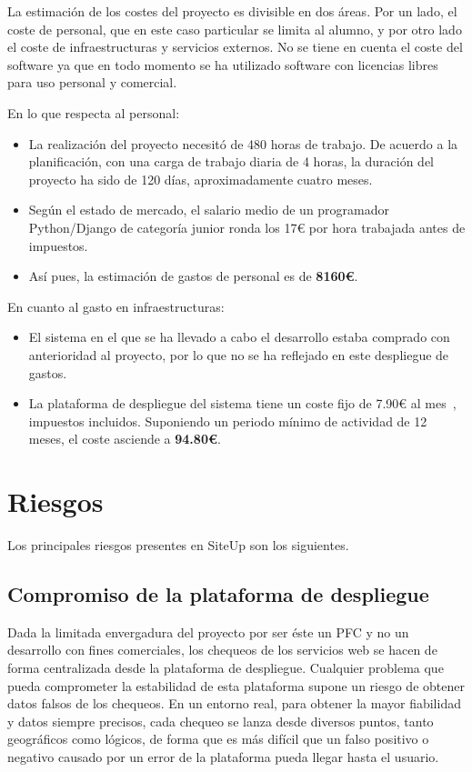 La estimación de los costes del proyecto es divisible en dos áreas. Por un lado,
el coste de personal, que en este caso particular se limita al alumno, y por
otro lado el coste de infraestructuras y servicios externos. No se tiene en
cuenta el coste del software ya que en todo momento se ha utilizado software con
licencias libres para uso personal y comercial.

En lo que respecta al personal:

\begin{itemize}
\item La realización del proyecto necesitó de 480 horas de trabajo. De acuerdo a
  la planificación, con una carga de trabajo diaria de 4 horas, la duración del
  proyecto ha sido de 120 días, aproximadamente cuatro meses.
\item Según el estado de mercado, el salario medio de un programador
  Python/Django de categoría junior ronda los 17€ por hora trabajada antes de
  impuestos.
\item Así pues, la estimación de gastos de personal es de \textbf{8160€}.
\end{itemize}

En cuanto al gasto en infraestructuras:

\begin{itemize}
\item El sistema en el que se ha llevado a cabo el desarrollo estaba comprado
  con anterioridad al proyecto, por lo que no se ha reflejado en este despliegue
  de gastos.

\item La plataforma de despliegue del sistema tiene un coste fijo de 7.90€ al
  mes~\cite{hetznervq7}, impuestos incluidos. Suponiendo un periodo mínimo de
  actividad de 12 meses, el coste asciende a \textbf{94.80€}.
\end{itemize}

\section{Riesgos}
\label{sec:riesgos}

Los principales riesgos presentes en SiteUp son los siguientes.

\subsection{Compromiso de la plataforma de despliegue}
\label{subsec:riesgo-compromiso-plataforma}

Dada la limitada envergadura del proyecto por ser éste un PFC y no un desarrollo
con fines comerciales, los chequeos de los servicios web se hacen de forma
centralizada desde la plataforma de despliegue. Cualquier problema que pueda
comprometer la estabilidad de esta plataforma supone un riesgo de obtener datos
falsos de los chequeos. En un entorno real, para obtener la mayor fiabilidad y
datos siempre precisos, cada chequeo se lanza desde diversos puntos, tanto
geográficos como lógicos, de forma que es más difícil que un falso positivo o
negativo causado por un error de la plataforma pueda llegar hasta el usuario.

